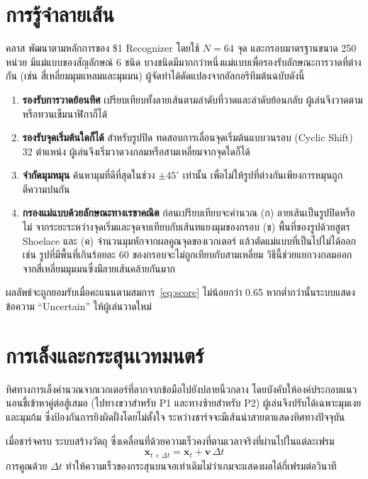 \documentclass[12pt,a4paper]{report}
\newcommand{\code}[1]{\texttt{\detokenize{#1}}}
\begin{document}
\section{การรู้จำลายเส้น}
คลาส \code{UnistrokeRecognizer} พัฒนาตามหลักการของ \$1 Recognizer โดยใช้ $N = 64$ จุด และกรอบมาตรฐานขนาด 250 หน่วย
มีแม่แบบของสัญลักษณ์ 6 ชนิด บางชนิดมีมากกว่าหนึ่งแม่แบบเพื่อรองรับลักษณะการวาดที่ต่างกัน
(เช่น สี่เหลี่ยมมุมแหลมและมุมมน) ผู้จัดทำได้ดัดแปลงจากอัลกอริทึมต้นฉบับดังนี้

\begin{enumerate}[leftmargin=2cm]
  \item \textbf{รองรับการวาดย้อนทิศ} เปรียบเทียบทั้งลายเส้นตามลำดับที่วาดและลำดับย้อนกลับ ผู้เล่นจึงวาดตามหรือทวนเข็มนาฬิกาก็ได้
  \item \textbf{รองรับจุดเริ่มต้นใดก็ได้} สำหรับรูปปิด ทดสอบการเลื่อนจุดเริ่มต้นแบบวนรอบ (Cyclic Shift) 32 ตำแหน่ง
        ผู้เล่นจึงเริ่มวาดวงกลมหรือสามเหลี่ยมจากจุดใดก็ได้
  \item \textbf{จำกัดมุมหมุน} ค้นหามุมที่ดีที่สุดในช่วง $\pm 45^\circ$ เท่านั้น เพื่อไม่ให้รูปที่ต่างกันเพียงการหมุนถูกตีความปนกัน
  \item \textbf{กรองแม่แบบด้วยลักษณะทางเรขาคณิต} ก่อนเปรียบเทียบจะคำนวณ (ก) ลายเส้นเป็นรูปปิดหรือไม่
        จากระยะระหว่างจุดเริ่มและจุดจบเทียบกับเส้นทแยงมุมของกรอบ (ข) พื้นที่ของรูปด้วยสูตร Shoelace
        และ (ค) จำนวนมุมหักจากผลคูณจุดของเวกเตอร์ แล้วตัดแม่แบบที่เป็นไปไม่ได้ออก
        เช่น รูปที่มีพื้นที่เกินร้อยละ 60 ของกรอบจะไม่ถูกเทียบกับสามเหลี่ยม วิธีนี้ช่วยแยกวงกลมออกจากสี่เหลี่ยมมุมมนซึ่งมีลายเส้นคล้ายกันมาก
\end{enumerate}

ผลลัพธ์จะถูกยอมรับเมื่อคะแนนตามสมการ~\eqref{eq:score} ไม่น้อยกว่า 0.65 หากต่ำกว่านั้นระบบแสดงข้อความ ``Uncertain''
ให้ผู้เล่นวาดใหม่

\section{การเล็งและกระสุนเวทมนตร์}
ทิศทางการเล็งคำนวณจากเวกเตอร์ที่ลากจากข้อมือไปยังปลายนิ้วกลาง โดยบังคับให้องค์ประกอบแนวนอนชี้เข้าหาคู่ต่อสู้เสมอ
(ไปทางขวาสำหรับ P1 และทางซ้ายสำหรับ P2) ผู้เล่นจึงปรับได้เฉพาะมุมเงยและมุมก้ม ซึ่งป้องกันการยิงผิดฝั่งโดยไม่ตั้งใจ
ระหว่างชาร์จจะมีเส้นนำสายตาแสดงทิศทางปัจจุบัน

เมื่อชาร์จครบ ระบบสร้างวัตถุ \code{Projectile} ซึ่งเคลื่อนที่ด้วยความเร็วคงที่ตามเวลาจริงที่ผ่านไปในแต่ละเฟรม
\begin{equation}
  \mathbf{x}_{t+\Delta t} = \mathbf{x}_t + \mathbf{v}\,\Delta t
\end{equation}
การคูณด้วย $\Delta t$ ทำให้ความเร็วของกระสุนบนจอเท่าเดิมไม่ว่าเกมจะแสดงผลได้กี่เฟรมต่อวินาที
\end{document}
